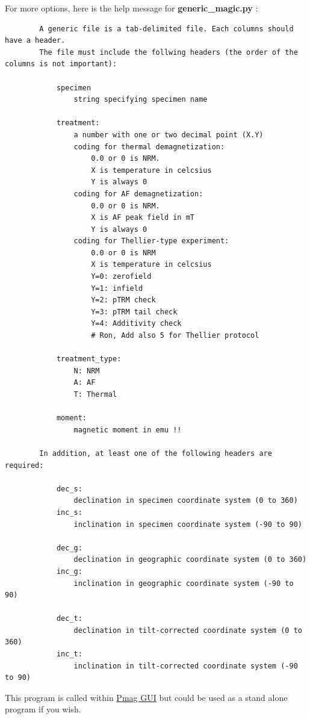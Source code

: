 \documentclass[11pt]{book}
\begin{document}
{{{{For more options, here is  the help message for {\bf generic\_magic.py }:
\begin{verbatim}
        A generic file is a tab-delimited file. Each columns should have a header.
        The file must include the follwing headers (the order of the columns is not important):

            specimen
                string specifying specimen name

            treatment:
                a number with one or two decimal point (X.Y)
                coding for thermal demagnetization:
                    0.0 or 0 is NRM.
                    X is temperature in celcsius
                    Y is always 0
                coding for AF demagnetization:
                    0.0 or 0 is NRM.
                    X is AF peak field in mT
                    Y is always 0
                coding for Thellier-type experiment:
                    0.0 or 0 is NRM
                    X is temperature in celcsius
                    Y=0: zerofield
                    Y=1: infield
                    Y=2: pTRM check
                    Y=3: pTRM tail check
                    Y=4: Additivity check
                    # Ron, Add also 5 for Thellier protocol

            treatment_type:
                N: NRM
                A: AF
                T: Thermal

            moment:
                magnetic moment in emu !!

        In addition, at least one of the following headers are required:

            dec_s:
                declination in specimen coordinate system (0 to 360)
            inc_s:
                inclination in specimen coordinate system (-90 to 90)

            dec_g:
                declination in geographic coordinate system (0 to 360)
            inc_g:
                inclination in geographic coordinate system (-90 to 90)

            dec_t:
                declination in tilt-corrected coordinate system (0 to 360)
            inc_t:
                inclination in tilt-corrected coordinate system (-90 to 90)
 \end{verbatim}

 This program is called within \href{#pmag_gui.py}{Pmag GUI} but could be used as a stand alone program if you wish.





}}}}
\end{document}
